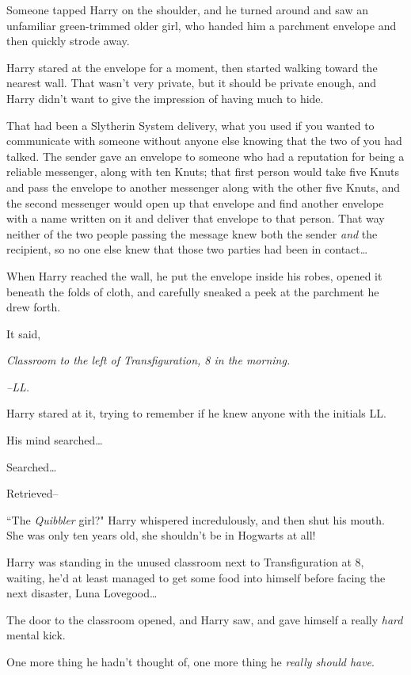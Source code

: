 Someone tapped Harry on the shoulder, and he turned around and saw an unfamiliar green-trimmed older girl, who handed him a parchment envelope and then quickly strode away.

Harry stared at the envelope for a moment, then started walking toward the nearest wall. That wasn't very private, but it should be private enough, and Harry didn't want to give the impression of having much to hide.

That had been a Slytherin System delivery, what you used if you wanted to communicate with someone without anyone else knowing that the two of you had talked. The sender gave an envelope to someone who had a reputation for being a reliable messenger, along with ten Knuts; that first person would take five Knuts and pass the envelope to another messenger along with the other five Knuts, and the second messenger would open up that envelope and find another envelope with a name written on it and deliver that envelope to that person. That way neither of the two people passing the message knew both the sender \emph{and} the recipient, so no one else knew that those two parties had been in contact{\ldots}

When Harry reached the wall, he put the envelope inside his robes, opened it beneath the folds of cloth, and carefully sneaked a peek at the parchment he drew forth.

It said,

\emph{Classroom to the left of Transfiguration, 8 in the morning.}

\emph{\---LL.}

Harry stared at it, trying to remember if he knew anyone with the initials LL.

His mind searched{\ldots}

Searched{\ldots}

Retrieved\---

``The \emph{Quibbler} girl?" Harry whispered incredulously, and then shut his mouth. She was only ten years old, she shouldn't be in Hogwarts at all!


Harry was standing in the unused classroom next to Transfiguration at 8\am, waiting, he'd at least managed to get some food into himself before facing the next disaster, Luna Lovegood{\ldots}

The door to the classroom opened, and Harry saw, and gave himself a really \emph{hard} mental kick.

One more thing he hadn't thought of, one more thing he \emph{really should have}.


